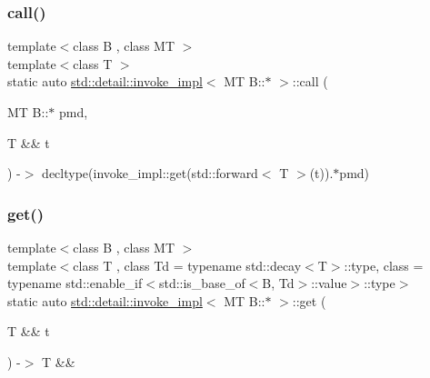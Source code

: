 \subsubsection{\texorpdfstring{call()}{call()}\hspace{0.1cm}{\footnotesize\ttfamily [2/2]}}
{\footnotesize\ttfamily template$<$class B , class MT $>$ \\
template$<$class T $>$ \\
static auto \hyperlink{structstd_1_1detail_1_1invoke__impl}{std\+::detail\+::invoke\+\_\+impl}$<$ MT B\+::$\ast$ $>$\+::call (\begin{DoxyParamCaption}\item[{MT B\+::$\ast$}]{pmd,  }\item[{T \&\&}]{t }\end{DoxyParamCaption}) -\/$>$  decltype(invoke\+\_\+impl\+::get(std\+::forward$<$ T $>$(t)).$\ast$pmd)\hspace{0.3cm}{\ttfamily [static]}}

\mbox{\label{structstd_1_1detail_1_1invoke__impl_3_01MT_01B_1_1_5_01_4_a5d586e031aeaa0ce27ab99163560fc29}} 
\subsubsection{\texorpdfstring{get()}{get()}\hspace{0.1cm}{\footnotesize\ttfamily [1/3]}}
{\footnotesize\ttfamily template$<$class B , class MT $>$ \\
template$<$class T , class Td  = typename std\+::decay$<$\+T$>$\+::type, class  = typename std\+::enable\+\_\+if$<$std\+::is\+\_\+base\+\_\+of$<$\+B, Td$>$\+::value$>$\+::type$>$ \\
static auto \hyperlink{structstd_1_1detail_1_1invoke__impl}{std\+::detail\+::invoke\+\_\+impl}$<$ MT B\+::$\ast$ $>$\+::get (\begin{DoxyParamCaption}\item[{T \&\&}]{t }\end{DoxyParamCaption}) -\/$>$  T \&\&\hspace{0.3cm}{\ttfamily [static]}}

\mbox{\label{structstd_1_1detail_1_1invoke__impl_3_01MT_01B_1_1_5_01_4_afe48fd9881ae5854f3e78a5186d5a45f}} 
